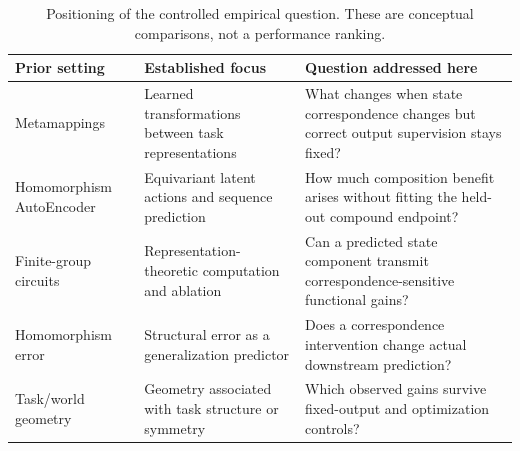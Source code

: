 \begin{table}[ht]
\centering\small
\begin{tabular}{p{.23\linewidth}p{.31\linewidth}p{.37\linewidth}}
\toprule
Prior setting & Established focus & Question addressed here\\\midrule
Metamappings \cite{lampinen2020} & Learned transformations between task representations & What changes when state correspondence changes but correct output supervision stays fixed?\\
Homomorphism AutoEncoder \cite{keurti2023} & Equivariant latent actions and sequence prediction & How much composition benefit arises without fitting the held-out compound endpoint?\\
Finite-group circuits \cite{chughtai2023} & Representation-theoretic computation and ablation & Can a predicted state component transmit correspondence-sensitive functional gains?\\
Homomorphism error \cite{an2026} & Structural error as a generalization predictor & Does a correspondence intervention change actual downstream prediction?\\
Task/world geometry \cite{turner2023,park2026,hwang2026} & Geometry associated with task structure or symmetry & Which observed gains survive fixed-output and optimization controls?\\
\bottomrule
\end{tabular}
\caption{Positioning of the controlled empirical question. These are conceptual comparisons, not a performance ranking.}\label{tab:related}
\end{table}
